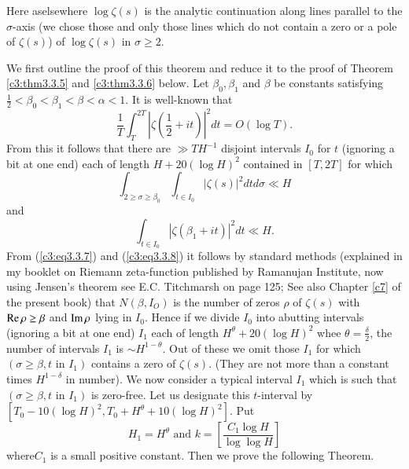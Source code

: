 \begin{remark*}
Here as\pageoriginale elsewhere $\log \zeta(s)$ is the analytic continuation along lines parallel to the $\sigma$-axis (we chose those and only those lines which do not contain a zero or a pole of $\zeta(s)$) of $\log \zeta(s)$ in $\sigma \geq 2$.
\end{remark*}

We first outline the proof of this theorem and reduce it to the proof of Theorem \ref{c3:thm3.3.5} and \ref{c3:thm3.3.6} below. Let $\beta_0, \beta_1$ and $\beta$ be constants satisfying $\frac{1}{2} < \beta_0 <\beta_1 < \beta < \alpha <1$. It is well-known that
$$
\frac{1}{T} \int^{2T}_T |\zeta \left(\frac{1}{2} + it \right)|^2 dt = O (\log T).
$$ 
From this it follows that there are $\gg T H^{-1}$ disjoint intervals $I_0$ for $t$ (ignoring a bit at one end) each of length $H + 20 (\log H)^2$ contained in $[T, 2T]$ for which
\begin{equation*}
\int_{2 \geq \sigma \geq \beta_0} \int_{t\in I_0} |\zeta(s)|^2 dt d\sigma \ll H  \tag{3.3.7}\label{c3:eq3.3.7}
\end{equation*}
and 
\begin{equation*}
\int_{t \in I_0}|\zeta(\beta_1 + it)|^2 dt \ll H.  \tag{3.3.8}\label{c3:eq3.3.8}
\end{equation*}
From (\ref{c3:eq3.3.7}) and (\ref{c3:eq3.3.8}) it follows by standard methods (explained in my booklet on Riemann zeta-function published by Ramanujan Institute, now using Jensen's theorem see E.C. Titchmarsh \cite{Titchmarsh2} on page 125; See also Chapter \ref{c7} of the present book) that $N(\beta, I_O)$ is the number of zeros $\rho$ of $\zeta(s)$ with $\operatorname{Re} \rho \geq \beta$ and $\operatorname{Im} \rho$ lying in $I_0$. Hence if we divide $I_0$ into abutting intervals (ignoring a bit at one end) $I_1$ each of length $H^{\theta} + 20 (\log H)^2$ whee $\theta =\frac{\delta}{2}$, the number of intervals $I_1$ is $\sim H^{1-\theta}$. Out of these we omit those $I_1$ for which $(\sigma \geq \beta, t \text{ in } I_1)$ contains a zero of $\zeta(s)$. (They are not more than a constant times $H^{1-\delta}$ in number). We now consider a typical interval $I_1$ which is such that $(\sigma \geq \beta, t \text{ in } I_1)$ is zero-free. Let us designate this $t$-interval by $[T_0 -10(\log H)^2, T_0 + H^\theta + 10 (\log H)^2]$. Put
\begin{equation*}
H_1 = H^\theta \text{ and } k = \left[ \frac{C_1 \log H}{\log \log H}\right]
\tag{3.3.9}\label{c3:eq3.3.9}
\end{equation*}
where\pageoriginale $C_1$ is a small positive constant. Then we prove the following Theorem. 

